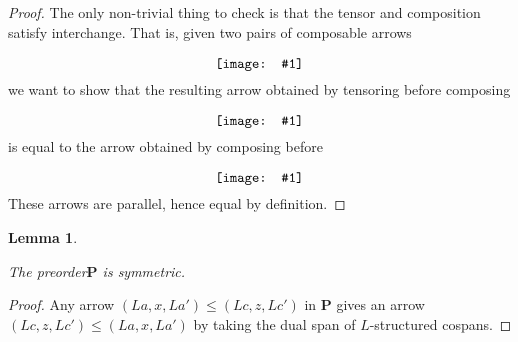\documentclass{amsart}
\newcommand{\A}{\cat{A}}
\renewcommand{\P}{\cat{P}}
\newcommand{\X}{\cat{X}}
\newcommand{\cat}[1]{\mathbf{#1}}
\newcommand{\diagram}[1]{\raisebox{-0.5\height}{\texttt{[image: \#1]}}}
\newcommand{\RRewrite}{ \mathbb{R}\mathbf{ewrite} }
\newcommand{\edit}[1]{\textcolor{editcolour}{(#1)}}
\newtheorem{lemma}[theorem]{Lemma}
\theoremstyle{remark}
\theoremstyle{definition}
\begin{document}
\begin{proof}
  
  The only non-trivial thing to check is that the tensor and
  composition satisfy interchange. That is, given two pairs of
  composable arrows
  \[
    \diagram{diag_nlr_preorder-interchange}
  \]
  we want to show that the resulting arrow obtained by tensoring before composing
  \[
    \diagram{diag_nlr_preorder-tensor-compose}
  \]
  is equal to the arrow obtained by composing before
  \[
    \diagram{diag_nlr_preorder-compose-tensor}
  \]
  These arrows are parallel, hence equal by definition.
  
\end{proof}

\begin{lemma}
  \label{thm:preord-symm}
  
  The preorder$ \P $ is symmetric.
  
\end{lemma}

\begin{proof}
  
  Any arrow $ ( La , x , La' ) \leq ( Lc , z , Lc' ) $ in
  $ \P $ gives an arrow
  $ ( Lc , z , Lc' ) \leq ( La , x , La' ) $ by taking the
  dual span of $ L $-structured cospans.
  
\end{proof}

\end{document}
